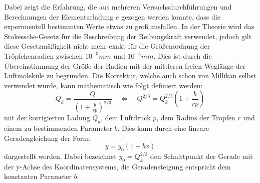 Dabei zeigt die Erfahrung, die aus mehreren Versuchsdurchführungen und Berechnungen der Elementarladung \( e \) gezogen werden konnte, dass die experimentell bestimmten Werte etwas zu groß ausfallen. In der Theorie wird das Stokessche-Gesetz für die Beschreibung der Reibungskraft verwendet, jedoch gilt diese Gesetzmäßigkeit nicht mehr exakt für die Größenordnung der Tröpfchenradien zwischen $10^{-3} \unit{mm}$ und $10^{-4} \unit{mm}$. Dies ist durch die Übereinstimmung der Größe der Radien mit der mittleren freien Weglänge der Luftmoleküle zu begründen. Die Korrektur, welche auch schon von Millikan selbst verwendet wurde, kann mathematisch wie folgt definiert werden:
\begin{equation}
	\label{eqn:b}
	Q_k = \frac{Q}{(1+\frac{b}{rp})^{2/3}} \quad\Leftrightarrow\quad Q^{2/3} = Q_{k}^{2/3} \left(1 + \frac{b}{rp}\right)
\end{equation}
mit der korrigierten Ladung \( Q_k \), dem Luftdruck \( p \), dem Radius der Tropfen \( r \) und einem zu bestimmenden Parameter \( b \). Dies kann durch eine lineare Geradengleichung der Form:
\begin{equation}
	y = y_0(1+bx)
\end{equation}
dargestellt werden. Dabei bezeichnet $y_0 = Q_{k}^{2/3} $ den Schnittpunkt der Gerade mit der y-Achse des Koordinatensystems, die Geradensteigung entspricht dem konstanten Parameter \( b \). 
